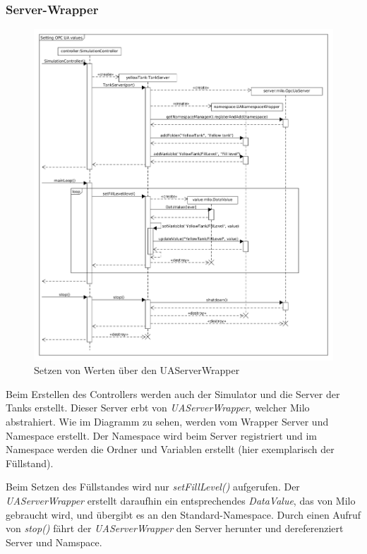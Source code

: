 \documentclass[parskip=full]{scrartcl}
\begin{document}
\subsubsection{Server-Wrapper}
\begin{figure}[H]
  \centering
  \includegraphics[scale=0.38]{design/sequence-diagrams/sequence-set-server-value.png}
  \caption{Setzen von Werten über den UAServerWrapper}
\end{figure}
Beim Erstellen des Controllers werden auch der Simulator und die Server der Tanks erstellt.
Dieser Server erbt von \emph{UAServerWrapper}, welcher Milo abstrahiert. Wie im Diagramm zu sehen,
werden vom Wrapper Server und Namespace erstellt. Der Namespace wird beim Server registriert und
im Namespace werden die Ordner und Variablen erstellt (hier exemplarisch der Füllstand).

Beim Setzen des Füllstandes wird nur \emph{setFillLevel()} aufgerufen. Der \emph{UAServerWrapper} erstellt daraufhin
ein entsprechendes \emph{DataValue}, das von Milo gebraucht wird, und übergibt es an den Standard-Namespace.
Durch einen Aufruf von \emph{stop()} fährt der \emph{UAServerWrapper} den Server herunter und dereferenziert
Server und Namspace.
\end{document}
